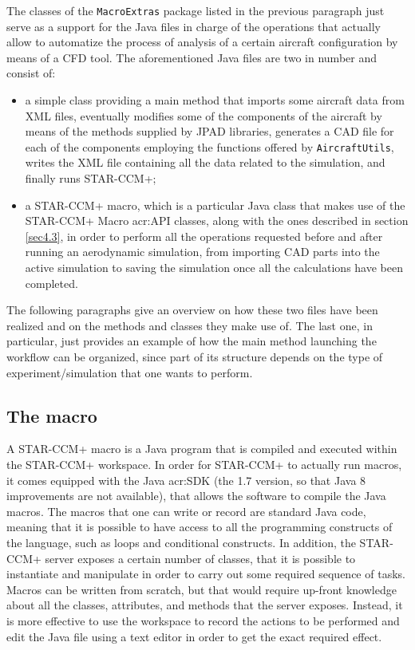 The classes of the \lstinline[language=Java]!MacroExtras! package listed in the previous paragraph just serve as a support for the Java files in charge of the operations that actually allow to automatize the process of analysis of a certain aircraft configuration by means of a \gls{CFD} tool. The aforementioned Java files are two in number and consist of:
%
\begin{itemize}
\item a simple class providing a main method that imports some aircraft data from XML files, eventually modifies some of the components of the aircraft by means of the methods supplied by \gls{JPAD} libraries, generates a \gls{CAD} file for each of the components employing the functions offered by \lstinline[language=Java]!AircraftUtils!, writes the XML file containing all the data related to the simulation, and finally runs STAR-CCM+;
\item a STAR-CCM+ macro, which is a particular Java class that makes use of the STAR-CCM+ Macro \gls{acr:API} classes, along with the ones described in section \ref{sec4.3}, in order to perform all the operations requested before and after running an aerodynamic simulation, from importing \gls{CAD} parts into the active simulation to saving the simulation once all the calculations have been completed.
\end{itemize}
%
The following paragraphs give an overview on how these two files have been realized and on the methods and classes they make use of. The last one, in particular, just provides an example of how the main method launching the workflow can be organized, since part of its structure depends on the type of experiment/simulation that one wants to perform.

\subsection{The macro}
\label{sec4.4.1}

A STAR-CCM+ macro is a Java program that is compiled and executed within the STAR-CCM+ workspace. In order for STAR-CCM+ to actually run macros, it comes equipped with the Java \gls{acr:SDK} (the 1.7 version, so that Java 8 improvements are not available), that allows the software to compile the Java macros. The macros that one can write or record are standard Java code, meaning that it is possible to have access to all the programming constructs of the language, such as loops and conditional constructs. In addition, the STAR-CCM+ server exposes a certain number of classes, that it is possible to instantiate and manipulate in order to carry out some required sequence of tasks. Macros can be written from scratch, but that would require up-front knowledge about all the classes, attributes, and methods that the server exposes. Instead, it is more effective to use the workspace to record the actions to be performed and edit the Java file using a text editor in order to get the exact required effect.

